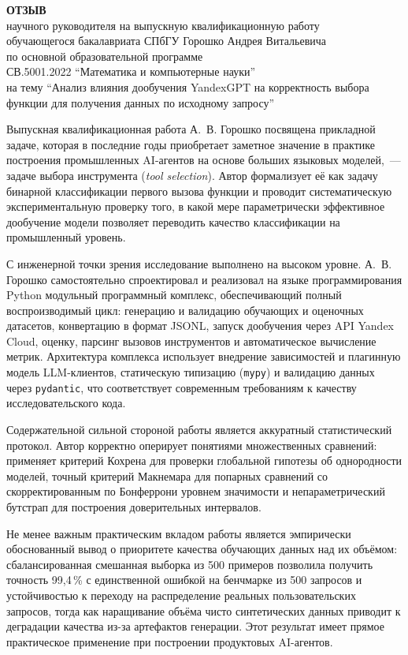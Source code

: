 \documentclass[12pt,a4paper]{article}
\begin{document}
\begin{center}
\Large\textbf{ОТЗЫВ}\\[0.3em]
\normalsize научного руководителя на выпускную квалификационную работу\\
обучающегося бакалавриата СПбГУ Горошко Андрея Витальевича\\
по основной образовательной программе\\
СВ.5001.2022 \enquote{Математика и компьютерные науки}\\
на тему \enquote{Анализ влияния дообучения YandexGPT на корректность выбора функции для получения данных по исходному запросу}
\end{center}

\vspace{0.8em}

Выпускная квалификационная работа А.~В. Горошко посвящена прикладной
задаче, которая в последние годы приобретает заметное значение в
практике построения промышленных AI-агентов на основе больших языковых
моделей,~--- задаче выбора инструмента (\textit{tool selection}). Автор
формализует её как задачу бинарной классификации первого вызова функции
и проводит систематическую экспериментальную проверку того, в какой
мере параметрически эффективное дообучение
модели позволяет переводить качество классификации на промышленный уровень.

С инженерной точки зрения исследование выполнено на высоком уровне.
А.~В. Горошко самостоятельно спроектировал и реализовал на языке
программирования Python модульный программный комплекс, обеспечивающий полный воспроизводимый цикл:
генерацию и валидацию обучающих и оценочных датасетов, конвертацию в
формат JSONL, запуск дообучения через API Yandex Cloud, оценку, парсинг
вызовов инструментов и автоматическое вычисление метрик. Архитектура
комплекса использует внедрение зависимостей и плагинную модель
LLM-клиентов, статическую типизацию (\texttt{mypy}) и валидацию данных
через \texttt{pydantic}, что соответствует современным требованиям к
качеству исследовательского кода.

Содержательной сильной стороной работы является аккуратный
статистический протокол. Автор корректно оперирует понятиями множественных
сравнений: применяет критерий Кохрена для проверки глобальной
гипотезы об однородности моделей, точный критерий Макнемара
для попарных сравнений со скорректированным по Бонферрони уровнем
значимости и непараметрический бутстрап для построения доверительных
интервалов.

Не менее важным практическим вкладом работы является эмпирически
обоснованный вывод о приоритете качества обучающих данных над их
объёмом: сбалансированная смешанная выборка из 500 примеров позволила
получить точность 99{,}4\,\% с единственной ошибкой на бенчмарке из
500 запросов и устойчивостью к переходу на распределение реальных
пользовательских запросов, тогда как наращивание объёма чисто
синтетических данных приводит к деградации качества из-за артефактов
генерации. Этот результат имеет прямое практическое применение при
построении продуктовых AI-агентов.
\end{document}
